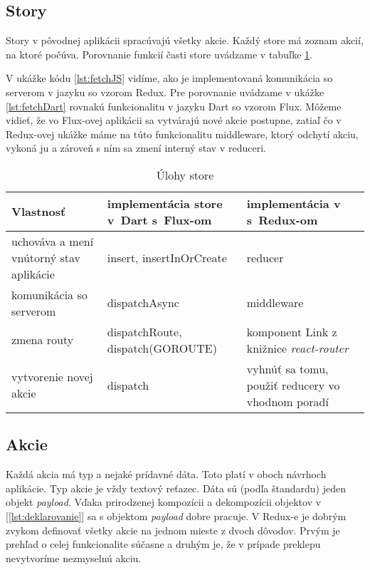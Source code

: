 \subsection{Story}
\NEW{}
Story v pôvodnej aplikácii spracúvajú všetky akcie. Každý store má zoznam akcií, na ktoré počúva. Porovnanie funkcií časti store uvádzame v tabuľke \ref{table:store}.

V ukážke kódu \ref{lst:fetchJS} vidíme, ako je implementovaná komunikácia so serverom v jazyku \JS{} so vzorom Redux. Pre porovnanie uvádzame v ukážke \ref{lst:fetchDart} rovnakú funkcionalitu v jazyku Dart so vzorom Flux. Môžeme vidieť, že vo Flux-ovej aplikácii sa vytvárajú nové akcie postupne, zatiaľ čo v Redux-ovej ukážke máme na túto funkcionalitu middleware, ktorý odchytí akciu, vykoná ju a zároveň s ním sa zmení interný stav v reduceri.

\begin{table}
  \caption{Úlohy store}
  \label{table:store}
  \begin{tabular}{| p{4cm} | p{5cm} | p{5cm} |}
   \hline         %
     Vlastnosť & implementácia store v~Dart s~Flux-om & implementácia v~\JS{} s~Redux-om \\
    \hline
    \hline
     uchováva a mení vnútorný stav aplikácie & 
     insert, insertInOrCreate &
     reducer \\
    \hline
     komunikácia so serverom & 
     dispatchAsync & 
     middleware \\
    \hline
     zmena routy & 
     dispatchRoute, dispatch(GOROUTE) & 
     komponent Link z knižnice \emph{react-router} \\
    \hline
     vytvorenie novej akcie & 
     dispatch & 
     vyhnúť sa tomu, použiť reducery vo vhodnom poradí \\%
    \hline
   \end{tabular}
\end{table}



\subsection{Akcie}
\NEW{}
Každá akcia má typ a nejaké prídavné dáta. %
Toto platí v oboch návrhoch aplikácie. Typ akcie je vždy textový reťazec. Dáta sú (podľa štandardu) jeden objekt \emph{payload}. 
Vďaka prirodzenej kompozícii a dekompozícii objektov v \JS{} [\ref{lst:deklarovanie}] sa s objektom \emph{payload} dobre pracuje. 
V Redux-e je dobrým zvykom definovať všetky akcie na jednom mieste z dvoch dôvodov. Prvým je prehľad o celej funkcionalite súčasne a druhým je, že v prípade preklepu nevytvoríme nezmyselnú akciu.

